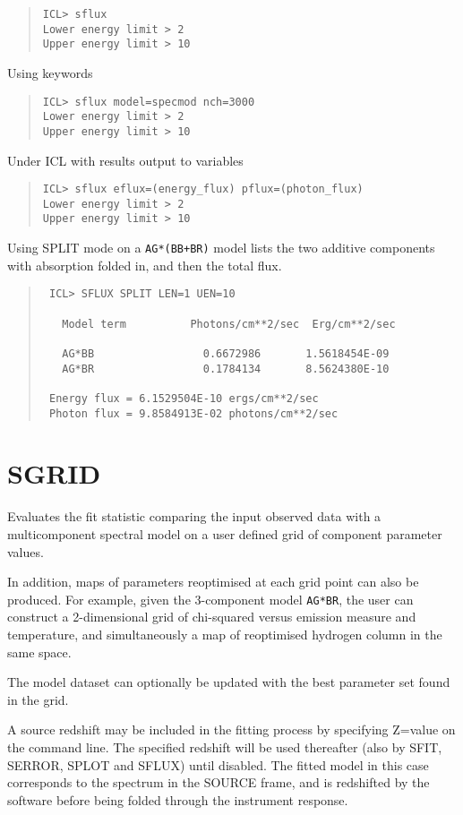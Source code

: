 \documentclass{book}
\renewcommand{\_}{{\tt\char'137}}     %
\begin{document}
\begin{quote}\begin{verbatim}
ICL> sflux
Lower energy limit > 2
Upper energy limit > 10
\end{verbatim}\end{quote}
Using keywords
\begin{quote}\begin{verbatim}
ICL> sflux model=specmod nch=3000
Lower energy limit > 2
Upper energy limit > 10
\end{verbatim}\end{quote}
Under ICL with results output to variables
\begin{quote}\begin{verbatim}
ICL> sflux eflux=(energy_flux) pflux=(photon_flux)
Lower energy limit > 2
Upper energy limit > 10
\end{verbatim}\end{quote}
Using SPLIT mode on a {\tt AG*(BB+BR)} model lists the two additive
components with absorption folded in, and then the total flux.
\begin{quote}\begin{verbatim}
 ICL> SFLUX SPLIT LEN=1 UEN=10
 
   Model term          Photons/cm**2/sec  Erg/cm**2/sec
 
   AG*BB                 0.6672986       1.5618454E-09
   AG*BR                 0.1784134       8.5624380E-10
 
 Energy flux = 6.1529504E-10 ergs/cm**2/sec
 Photon flux = 9.8584913E-02 photons/cm**2/sec
\end{verbatim}\end{quote}
\section{SGRID}
Evaluates the fit statistic comparing the input observed data
with a multicomponent spectral model on a user defined grid of
component parameter values.
 
In addition, maps of parameters reoptimised at each grid point
can also be produced. For example, given the 3-component model
{\tt AG*BR}, the user can construct a 2-dimensional grid of chi-squared
versus emission measure and temperature, and simultaneously a
map of reoptimised hydrogen column in the same space.
 
The model dataset can optionally be updated with the best
parameter set found in the grid.
 
A source redshift may be included in the fitting process by
specifying Z=value on the command line. The specified redshift
will be used thereafter (also by SFIT, SERROR, SPLOT and SFLUX)
until disabled. The fitted model in this case corresponds to the
spectrum in the SOURCE frame, and is redshifted by the software
before being folded through the instrument response.
 
\end{document}
